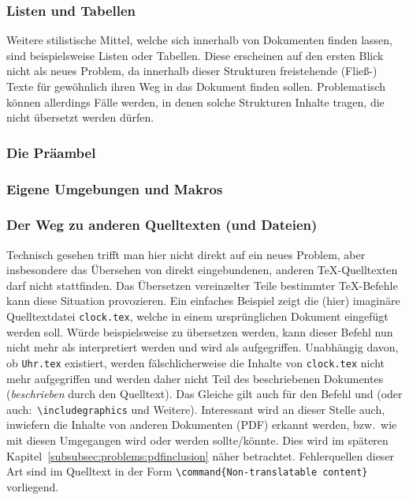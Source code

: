 \subsubsection{Listen und Tabellen}
Weitere stilistische Mittel, welche sich innerhalb von Dokumenten finden lassen, sind beispielsweise Listen oder Tabellen. Diese erscheinen auf den ersten Blick nicht als neues Problem, da innerhalb dieser Strukturen freistehende (Fließ-) Texte für gewöhnlich ihren Weg in das Dokument finden sollen. Problematisch können allerdings Fälle werden, in denen solche Strukturen Inhalte tragen, die nicht übersetzt werden dürfen.  

\subsubsection{Die Präambel}%

\subsubsection{Eigene Umgebungen und Makros}\label{subsubsec:problems:uniqueenvironments}


\subsubsection{Der Weg zu anderen Quelltexten (und Dateien)}%
Technisch gesehen trifft man hier nicht direkt auf ein neues Problem, aber insbesondere das Übersehen von direkt eingebundenen, anderen \TeX{}-Quelltexten darf nicht stattfinden. Das Übersetzen vereinzelter Teile bestimmter \TeX{}-Befehle kann diese Situation provozieren. Ein einfaches Beispiel zeigt die (hier) imaginäre Quelltextdatei \texttt{clock.tex}, welche in einem ursprünglichen Dokument eingefügt werden soll.  
Würde beispielsweise \verb|| zu \verb|| übersetzen werden, kann dieser Befehl nun nicht mehr als \verb|| interpretiert werden und wird als \verb|| aufgegriffen. Unabhängig davon, ob \texttt{Uhr.tex} existiert, werden fälschlicherweise die Inhalte von \texttt{clock.tex} nicht mehr aufgegriffen und werden daher nicht Teil des beschriebenen Dokumentes (\textit{beschrieben} durch den Quelltext).
Das Gleiche gilt auch für den Befehl \verb|| und \verb|| (oder auch:\ \verb|\includegraphics| und Weitere). Interessant wird an dieser Stelle auch, inwiefern die Inhalte von anderen Dokumenten (PDF) erkannt werden, bzw.\ wie mit diesen Umgegangen wird oder werden sollte/könnte. Dies wird im späteren Kapitel~\ref{subsubsec:problems:pdfinclusion} näher betrachtet.
Fehlerquellen dieser Art sind im Quelltext in der Form \verb|\command{Non-translatable content}| vorliegend.


